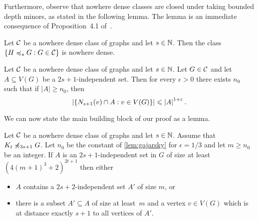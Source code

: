 Furthermore, observe that nowhere dense classes are closed under
taking bounded depth minors, as stated in the following lemma. 
The lemma is an immediate consequence of Proposition~4.1 
of~\cite{sparsity}. 

\begin{lemma}
Let $\mathcal{C}$ be a nowhere dense class of graphs and let $s\in \mathbb{N}$. 
Then the class $\{H \preccurlyeq_s G : G\in \mathcal{C}\}$ is nowhere dense. 
\end{lemma}

\begin{corollary}\label{lem:gajarsky}
Let $\mathcal{C}$ be a nowhere dense class of graphs and let $s\in \mathbb{N}$. 
Let $G\in \mathcal{C}$ and let $A\subseteq V(G)$ be a $2s+1$-independent
set. 
Then for every $\epsilon>0$ there exists $n_0$ such that if $|A|\geq n_0$, then 
\[\left\lvert\{N_{s+1}(v)\cap A : v\in V(G)\}\right\rvert\leqslant\left\lvert A\right\rvert^{1+\varepsilon}.\]
\end{corollary}

We can now state the main building block of our proof as a lemma. 

\begin{lemma}\label{lem:apex}
Let $\mathcal{C}$ be a nowhere dense class of graphs and let $s\in \mathbb{N}$. 
Assume that $K_t\not\preccurlyeq_{3s+1} G$. 
Let $n_0$ be the constant of \cref{lem:gajarsky} for $\epsilon=1/3$ 
and let $m\geq n_0$ be an integer. 
If $A$ is an $2s+1$-independent set in $G$ of size at least $(4(m+1)^3+2)^{2t+1}$ 
then either 
\begin{itemize}
\item $A$ contains a $2s+2$-independent set $A'$ of size $m$, or
\item there is a subset $A'\subseteq A$ of size at least~$m$ and
a vertex $v\in V(G)$ which is at distance exactly $s+1$ to all vertices of $A'$. 
\end{itemize}
\end{lemma}




